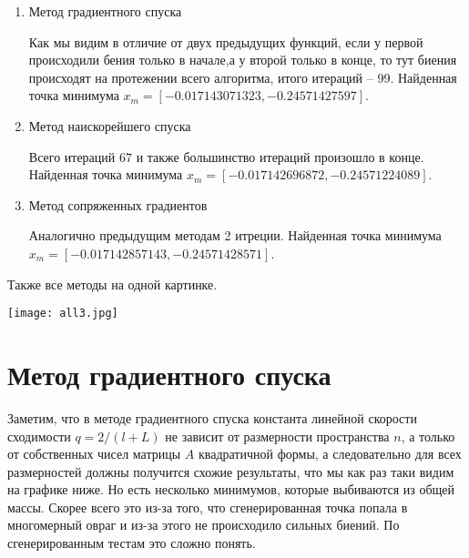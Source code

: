 \begin{enumerate}
    \item Метод градиентного спуска
    
    Как мы видим в отличие от двух предыдущих функций, если у первой происходили бения только в начале,а у
    второй только в конце, то тут биения происходят на протежении всего алгоритма, итого итераций -- 99.
    Найденная точка минимума $x_m = [-0.017143071323, -0.24571427597]$.



    \item Метод наискорейшего спуска
    

    Всего итераций $67$ и также большинство итераций произошло в конце.
    Найденная точка минимума $x_m = [-0.017142696872, -0.24571224089]$.

    \item Метод сопряженных градиентов
    
    Аналогично предыдущим методам 2 итреции.
    Найденная точка минимума $x_m = [-0.017142857143, -0.24571428571]$.



\end{enumerate}

Также все методы на одной картинке.

\texttt{[image: all3.jpg]}

\section{Метод градиентного спуска}

Заметим, что в методе градиентного спуска константа линейной скорости сходимости $q = 2/(l + L)$ не зависит
от размерности пространства $n$, а только от собственных чисел матрицы $A$ квадратичной формы, а следовательно
для всех размерностей должны получится схожие результаты, что мы как раз таки видим на графике ниже.
Но есть несколько минимумов, которые выбиваются из общей массы.
 Скорее всего это из-за того, что сгенерированная
точка попала в многомерный овраг и из-за этого не происходило сильных биений. По сгенерированным
тестам это сложно понять.



